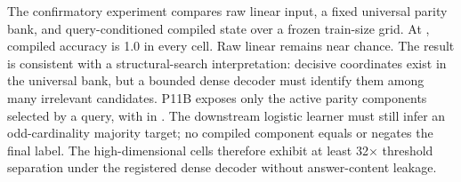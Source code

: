\markdownRendererDocumentBegin
\markdownRendererSectionBegin
{}\markdownRendererInterblockSeparator
{}The confirmatory experiment compares raw linear input, a fixed universal parity bank, and query-conditioned compiled state over a frozen train-size grid.\markdownRendererInterblockSeparator
{}\markdownRendererInterblockSeparator
{}At , compiled accuracy is 1.0 in every cell. Raw linear remains near chance. The result is consistent with a structural-search interpretation: decisive coordinates exist in the universal bank, but a bounded dense decoder must identify them among many irrelevant candidates.\markdownRendererInterblockSeparator
{}\markdownRendererSectionBegin
{}\markdownRendererInterblockSeparator
{}P11B exposes only the  active parity components selected by a query, with  in . The downstream logistic learner must still infer an odd-cardinality majority target; no compiled component equals or negates the final label.\markdownRendererInterblockSeparator
{}\markdownRendererInterblockSeparator
{}The high-dimensional cells therefore exhibit at least 32× threshold separation under the registered dense decoder without answer-content leakage.
\markdownRendererSectionEnd 
\markdownRendererSectionEnd \markdownRendererDocumentEnd